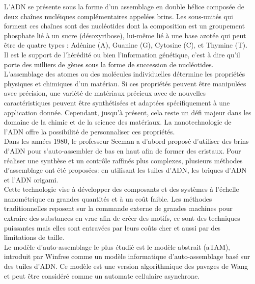 \documentclass[12pt]{article}
\theoremstyle{definition}
\begin{document}
	L'ADN se présente sous la forme d'un assemblage en double hélice composée de deux chaînes nucléiques complémentaires appelées brins. Les sous-unités qui forment ces chaînes sont des nucléotides dont la composition est un groupement phosphate lié à un sucre (désoxyribose), lui-même lié à une base azotée qui peut être de quatre types : Adénine (A), Guanine (G), Cytosine (C), et Thymine (T). Il est le support de l'hérédité ou bien l'information génétique, c'est à dire qu'il porte des milliers de gènes sous la forme de succession de nucléotides.\\
	
	L'assemblage  des  atomes  ou  des  molécules  individuelles  détermine  les  propriétés  physiques  et  chimiques  d'un  matériau. Si  ces  propriétés  peuvent  être  manipulées  avec  précision,  une  variété  de  matériaux  précieux  avec  de  nouvelles  caractéristiques peuvent  être  synthétisées et adaptées  spécifiquement  à  une  application  donnée.  Cependant,  jusqu'à  présent,  cela  reste  un défi majeur  dans  les  domaine  de  la  chimie  et  de  la  science  des  matériaux. La  nanotechnologie  de  l'ADN  offre  la  possibilité  de  personnaliser  ces  propriétés.\\
	
	Dans  les  années  1980,  le  professeur  Seeman  a  d'abord  proposé  d'utiliser  des  brins  d'ADN  pour  s'auto-assembler  de  bas  en  haut  afin de former des cristaux. Pour réaliser une synthèse et un contrôle raffinés plus complexes, plusieurs méthodes d'assemblage ont été proposées: en utilisant les tuiles d'ADN, les briques d'ADN et l'ADN origami.\\
	
	Cette technologie vise  à  développer  des  composants et  des  systèmes  à  l'échelle  nanométrique  en  grandes  quantités et à  un  coût  faible. Les  méthodes  traditionnelles  reposent  sur la commande externe de  grandes  machines    pour  extraire des  substances en  vrac afin de créer des motifs, ce  sont des techniques puissantes mais elles sont entravées par leurs coûts cher et aussi par des limitations de taille.\\
	
	Le modèle d'auto-assemblage le plus étudié est le modèle abstrait (aTAM), introduit par Winfree comme un modèle informatique d'auto-assemblage basé sur des tuiles d'ADN. Ce modèle est une version algorithmique des pavages de Wang et peut être considéré comme un automate cellulaire asynchrone.\\
	
\end{document}
